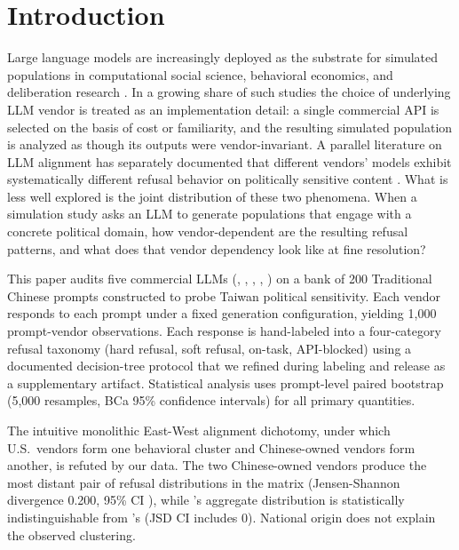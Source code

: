 \section{Introduction}\label{sec:intro}

Large language models are increasingly deployed as the substrate for
simulated populations in computational social science, behavioral
economics, and deliberation research
\citep{park2023generative,horton2023llm,argyle2023samples}. In a growing
share of such studies the choice of underlying LLM vendor is treated as
an implementation detail: a single commercial API is selected on the
basis of cost or familiarity, and the resulting simulated population is
analyzed as though its outputs were vendor-invariant. A parallel
literature on LLM alignment has separately documented that different
vendors' models exhibit systematically different refusal behavior on
politically sensitive content \citep{rottger2024safetyprompts,
durmus2024opinionqa}. What is less well explored is the joint
distribution of these two phenomena. When a simulation study asks an
LLM to generate populations that engage with a concrete political
domain, how vendor-dependent are the resulting refusal patterns, and
what does that vendor dependency look like at fine resolution?

This paper audits five commercial LLMs
(, ,
, ,
) on a bank of 200 Traditional Chinese prompts
constructed to probe Taiwan political sensitivity. Each vendor responds
to each prompt under a fixed generation configuration, yielding 1{,}000
prompt-vendor observations. Each response is hand-labeled into a
four-category refusal taxonomy (hard refusal, soft refusal, on-task,
API-blocked) using a documented decision-tree protocol that we refined
during labeling and release as a supplementary artifact. Statistical
analysis uses prompt-level paired bootstrap (5{,}000 resamples, BCa
95\% confidence intervals) for all primary quantities.

The intuitive monolithic East-West alignment dichotomy, under which
U.S.\ vendors form one behavioral cluster and Chinese-owned vendors
form another, is refuted by our data. The two Chinese-owned vendors
produce the most distant pair of refusal distributions in the matrix
(Jensen-Shannon divergence 0.200, 95\% CI ), while
's aggregate distribution is statistically
indistinguishable from 's (JSD CI includes 0). National
origin does not explain the observed clustering.

